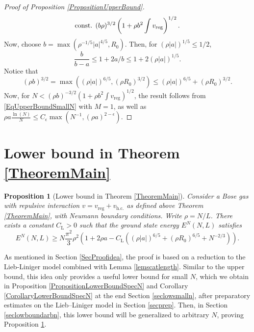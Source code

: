 \documentclass[a4paper,11pt]{article}
\newcommand{\abs}[1]{\left\lvert #1 \right\rvert}
\newtheorem{proposition}[theorem]{Proposition}
\numberwithin{equation}{section}
\begin{document}
\begin{proof}[Proof of Proposition \ref{PropositionUpperBound}]
\begin{equation}
	\text{const. }(b\rho)^{3/2}\left(1+\rho b^2 \int v_{\textnormal{reg}}\right)^{1/2}.
	\end{equation}
	Now, choose $ b=\max(\rho^{-1/5}\abs{a}^{4/5},R_0) $. Then, for $(\rho \abs{a})^{1/5}\leq 1/2$, 
	\begin{equation}
	\frac{b}{b-a}\leq1+2a/b\leq  1+2(\rho\abs{a})^{1/5}.
	\end{equation}
	Notice that
	\begin{equation}(\rho b)^{3/2}= \max\left((\rho \abs{a})^{6/5},(\rho R_0)^{3/2}\right)\leq  (\rho \abs{a})^{6/5}+(\rho R_0)^{3/2}. 
	\end{equation}
	Now, for $ N<(\rho b)^{-3/2}\left(1+\rho b^2\int v_{\text{reg}}\right)^{1/2} $, the result follows from \eqref{EqUpperBoundSmallN} with $M=1$, as well as $\rho a \frac{\ln(N)}{N}\leq  C_\epsilon\max (N^{-1},(\rho a)^{2-\epsilon} )$.
\end{proof}

\section{Lower bound in Theorem \ref{TheoremMain}}	
\label{SecLowerbound}
	\begin{proposition}[Lower bound in Theorem \ref{TheoremMain}]
		\label{PropositionLowerBound}
		Consider a Bose gas with repulsive interaction  $v=v_{\text{reg}}+v_{\text{h.c.}}$ as defined above Theorem \ref{TheoremMain}, with Neumann boundary conditions. Write $\rho=N/L$. There exists a constant $C_\text{L}>0$ such that the ground state energy $E^N(N,L)$ satisfies
		\begin{equation}
		\label{eqlower}
		E^N(N,L)\geq N\frac{\pi^2}{3}\rho^2\left(1+2\rho a-C_\text{L}\left((\rho\abs{a})^{6/5}+(\rho R_0)^{6/5}+N^{-2/3}\right)\right).
		\end{equation}
	\end{proposition}
As mentioned in Section \ref{SecProofidea}, the proof is based on a reduction to the Lieb-Liniger model combined with Lemma \ref{lemscatlength}. Similar to the upper bound, this idea only provides a useful lower bound for small $N$, which we obtain in Proposition \ref{PropositionLowerBoundSpecN} and Corollary \ref{CorollaryLowerBoundSpecN} at the end Section \ref{seclowsmalln}, after preparatory estimates on the Lieb--Liniger model in Section \ref{secprep}. Then, in Section \ref{seclowboundarbn}, this lower bound will be generalized to arbitrary $N$, proving Proposition \ref{PropositionLowerBound}.
\end{document}
